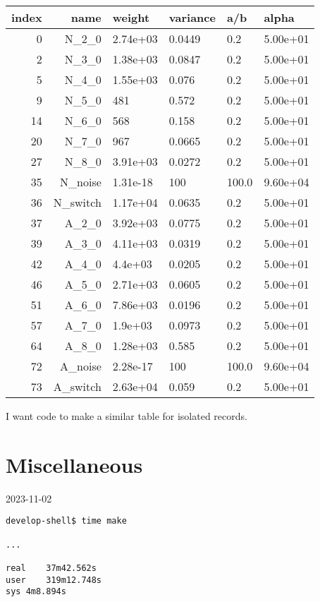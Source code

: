 \documentclass[12pt]{article}
\begin{document}
\begin{description}
  \begin{tabular*}{1.0\linewidth}[c]{rrllll}
    index & name & weight &  variance & a/b &    alpha \\ \hline
  0 & N\_2\_0     &    2.74e+03  &  0.0449 &  0.2& 5.00e+01 \\
  2 & N\_3\_0     &    1.38e+03  &  0.0847 &  0.2& 5.00e+01 \\
  5 & N\_4\_0     &    1.55e+03  &   0.076 &  0.2& 5.00e+01 \\
  9 & N\_5\_0     &    481       &   0.572 &  0.2& 5.00e+01 \\
 14 & N\_6\_0     &    568       &   0.158 &  0.2& 5.00e+01 \\
 20 & N\_7\_0     &    967       &  0.0665 &  0.2& 5.00e+01 \\
 27 & N\_8\_0     &    3.91e+03  &  0.0272 &  0.2& 5.00e+01 \\
 35 & N\_noise   &    1.31e-18  &     100 &100.0& 9.60e+04 \\
 36 & N\_switch  &    1.17e+04  &  0.0635 &  0.2& 5.00e+01 \\
 37 & A\_2\_0     &    3.92e+03  &  0.0775 &  0.2& 5.00e+01 \\
 39 & A\_3\_0     &    4.11e+03  &  0.0319 &  0.2& 5.00e+01 \\
 42 & A\_4\_0     &    4.4e+03   &  0.0205 &  0.2& 5.00e+01 \\
 46 & A\_5\_0     &    2.71e+03  &  0.0605 &  0.2& 5.00e+01 \\
 51 & A\_6\_0     &    7.86e+03  &  0.0196 &  0.2& 5.00e+01 \\
 57 & A\_7\_0     &    1.9e+03   &  0.0973 &  0.2& 5.00e+01 \\
 64 & A\_8\_0     &    1.28e+03  &   0.585 &  0.2& 5.00e+01 \\
 72 & A\_noise   &    2.28e-17  &     100 &100.0& 9.60e+04 \\
 73 & A\_switch  &    2.63e+04  &   0.059 &  0.2& 5.00e+01
  \end{tabular*}
  I want code to make a similar table for isolated records.

\end{description}

\section{Miscellaneous}
\label{sec:misc}

2023-11-02
\begin{verbatim}
develop-shell$ time make

...

real	37m42.562s
user	319m12.748s
sys	4m8.894s

\end{verbatim}
\end{document}
